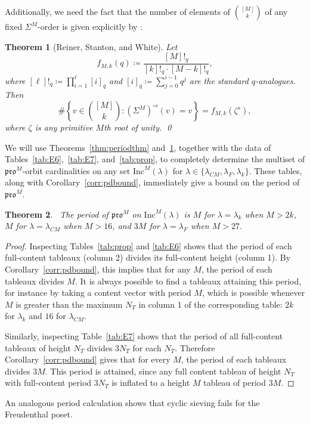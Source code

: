 \documentclass[12pt]{amsart}
\newtheorem{theorem}{Theorem}[section]
\theoremstyle{definition}
\theoremstyle{remark}
\numberwithin{equation}{section}
\newcommand{\inc}{\ensuremath{\mathrm{Inc}}}
\newcommand{\pro}{\mathfrak{pro}}
\begin{document}
 Additionally, we need the fact that the number of elements of $\binom{[M]}{k}$ of any fixed $\Sigma^M$-order is given explicitly by \cite[Theorem~1.1(b)]{Reiner.Stanton.White}:
\begin{theorem}[Reiner, Stanton, and White]\label{thm:rsw}
Let \[f_{M,k}(q) \coloneqq \frac{[M]!_q}{[k]!_q\cdot [M-k]!_q},\] where $[\ell]!_q \coloneqq \prod_{i=1}^\ell [i]_q$ and $[i]_q \coloneqq \sum_{j = 0}^{i-1} q^j$ are the standard $q$-analogues. Then 
\[\#\left\{ v \in \binom{[M]}{k} : (\Sigma^M)^{\circ s}(v) = v \right\} = f_{M,k}(\zeta^s),\] where $\zeta$ is any primitive $M$th root of unity. \qed
\end{theorem} 
We will use Theorems~\ref{thm:periodthm} and~\ref{thm:rsw}, together with the data of Tables~\ref{tab:E6},~\ref{tab:E7}, and~\ref{tab:prop}, to completely determine the multiset of $\pro^M$-orbit cardinalities on any set $\inc^M(\lambda)$ for $\lambda \in \{ \lambda_{CM}, \lambda_F, \lambda_k \}$. These tables, along with Corollary~\ref{corr:pdbound}, immediately give a bound on the period of $\pro^M$.
\\
\begin{theorem}~\label{thm:actualpdbound}
The period of $\pro^M$ on $\inc^M(\lambda)$ is $M$ for $\lambda = \lambda_k$ when $M > 2k$, $M$ for $\lambda = \lambda_{CM}$ when $M > 16$, and $3M$ for $\lambda = \lambda_{F}$ when $M > 27$.
\end{theorem}
\begin{proof}
Inspecting Tables~\ref{tab:prop} and \ref{tab:E6} shows that the period of each full-content tableaux (column 2) divides its full-content height (column 1). By Corollary~\ref{corr:pdbound}, this implies that for any $M$, the period of each tableaux divides $M$. It is always possible to find a tableaux attaining this period, for instance by taking a content vector with period $M$, which is possible whenever $M$ is greater than the maximum $N_T$ in column 1 of the corresponding table: $2k$ for $\lambda_k$ and $16$ for $\lambda_{CM}$. 

Similarly, inspecting Table~\ref{tab:E7} shows that the period of all full-content tableaux of height $N_T$ divides $3N_T$ for each $N_T$. Therefore Corollary~\ref{corr:pdbound} gives that for every $M$, the period of each tableaux divides $3M$. This period is attained, since any full content tableau of height $N_T$ with full-content period $3N_T$ is inflated to a height $M$ tableau of period $3M$. 

\end{proof}
An analogous period calculation shows that cyclic sieving fails for the Freudenthal poset.
\end{document}
